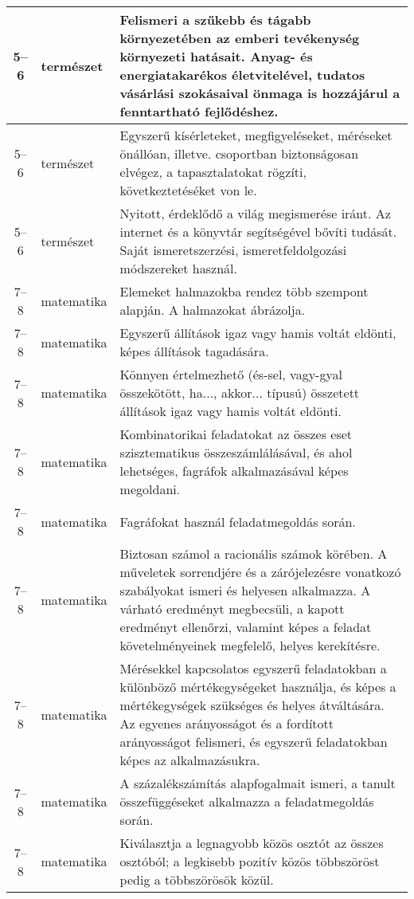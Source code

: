 \begin{small}
\begin{longtable}{c | p{2cm} |  p{11cm} }
              5--6 & természet & Felismeri a szűkebb és tágabb környezetében az emberi tevékenység környezeti hatásait. Anyag- és energiatakarékos életvitelével, tudatos vásárlási szokásaival önmaga is hozzájárul a fenntartható fejlődéshez. \\ \hline
              5--6 & természet & Egyszerű kísérleteket, megfigyeléseket, méréseket önállóan, illetve. csoportban biztonságosan elvégez, a tapasztalatokat rögzíti, következtetéséket von le. \\ \hline
              5--6 & természet & Nyitott, érdeklődő a világ megismerése iránt. Az internet és a könyvtár segítségével bővíti tudását. Saját ismeretszerzési, ismeretfeldolgozási módszereket használ. \\ \hline
              7--8 & matematika & Elemeket halmazokba rendez több szempont alapján. A halmazokat ábrázolja. \\ \hline
              7--8 & matematika & Egyszerű állítások igaz vagy hamis voltát eldönti, képes állítások tagadására. \\ \hline
              7--8 & matematika & Könnyen értelmezhető (és-sel, vagy-gyal összekötött, ha..., akkor... típusú) összetett állítások igaz vagy hamis voltát eldönti. \\ \hline
              7--8 & matematika & Kombinatorikai feladatokat az összes eset szisztematikus összeszámlálásával, és ahol lehetséges, fagráfok alkalmazásával képes megoldani. \\ \hline
              7--8 & matematika & Fagráfokat használ feladatmegoldás során. \\ \hline
              7--8 & matematika & Biztosan számol a racionális számok körében. A műveletek sorrendjére és a zárójelezésre vonatkozó szabályokat ismeri és helyesen alkalmazza. A várható eredményt megbecsüli, a kapott  eredményt ellenőrzi, valamint képes a feladat követelményeinek megfelelő, helyes kerekítésre. \\ \hline
              7--8 & matematika & Mérésekkel kapcsolatos egyszerű feladatokban a különböző mértékegységeket használja, és képes a mértékegységek szükséges és helyes átváltására. Az egyenes arányosságot és a fordított arányosságot felismeri, és egyszerű feladatokban képes az alkalmazásukra.
 \\ \hline
              7--8 & matematika & A százalékszámítás alapfogalmait ismeri, a tanult összefüggéseket alkalmazza a  feladatmegoldás során. \\ \hline
              7--8 & matematika & Kiválasztja a legnagyobb közös osztót az összes osztóból; a legkisebb pozitív közös többszöröst pedig a többszörösök közül. \\ \hline

\end{longtable}
\end{small}
